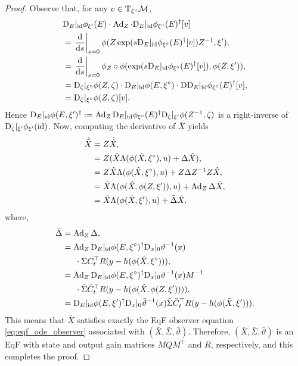\documentclass{article}
\newcommand\at[2]{\left.#1\right|_{#2}}
\newcommand{\dds}{\frac{\td}{\td s}}
\begin{document}
\begin{proof}
Observe that, for any $v \in \mathrm{T}_{{\xi}^\circ} \mathcal{M}$,
\begin{align*}
    &\tD_E |_\id \phi_{\xi'}(E) \cdot \Ad_Z 
    \cdot \tD_E |_\id \phi_{\mr{\xi}}(E)^\dagger [v] \\
    &= \at{\dds}{s=0} \phi(Z \exp( s \tD_E |_\id \phi_{\mr{\xi}}(E)^\dagger [v]) Z^{-1}, \xi'), \\
    &= \at{\dds}{s=0} \phi_Z \circ \phi(\exp( s \tD_E |_\id \phi_{\mr{\xi}}(E)^\dagger [v]), \phi(Z, \xi')), \\
    &= \tD_\zeta |_{\mr{\xi}} \phi(Z, \zeta)
    \cdot \tD_E |_\id \phi(E, \mr{\xi})
    \cdot \tD \tD_E |_\id \phi_{\mr{\xi}}(E)^\dagger [v], \\
    &= \tD_\zeta |_{\mr{\xi}} \phi(Z, \zeta) [v].
\end{align*}
Hence $\mathrm{D}_E |_{\mathrm{id}} \phi(E, \xi')^\dagger := \operatorname{Ad}_Z \mathrm{D}_E |_{\mathrm{id}} \phi_{{\xi}^\circ}(E)^\dagger \mathrm{D}_\zeta |_{\xi'} \phi(Z^{-1}, \zeta)$ is a right-inverse of $\mathrm{D}_\zeta |_{\xi'} \phi_{\xi'}(\mathrm{id})$.
Now, computing the derivative of $\bar{X}$ yields
\begin{align*}
    \dot{\bar{X}}
    &= Z \dot{\hat{X}}, \\
    &= Z (\hat{X} \Lambda(\phi(\hat{X}, {\xi}^\circ), u) + \Delta \hat{X}), \\
    &= Z \hat{X} \Lambda(\phi(\hat{X}, {\xi}^\circ), u) + Z \Delta Z^{-1} Z \hat{X}, \\
    &= \bar{X} \Lambda(\phi(\hat{X}, \phi(Z, \xi')), u) + \operatorname{Ad}_Z \Delta \bar{X}, \\
    &= \bar{X} \Lambda(\phi(\bar{X}, \xi'), u) + \bar{\Delta} \bar{X},
\end{align*}
where,
\begin{align*}
    \bar{\Delta} &= \operatorname{Ad}_Z \Delta, \\
    &= \operatorname{Ad}_Z \mathrm{D}_E |_{\mathrm{id}} \phi(E, {\xi}^\circ)^{\dagger} \mathrm{D}_x |_0 \vartheta^{-1}(x)
    \\ &\phantom{==}
    \cdot \Sigma C_t^\top R (y - h(\phi(\hat{X}, {\xi}^\circ))), \\
    &= \operatorname{Ad}_Z \mathrm{D}_E |_{\mathrm{id}} \phi(E, {\xi}^\circ)^{\dagger} \mathrm{D}_x |_0 \vartheta^{-1}(x) M^{-1}
    \\ &\phantom{==}
    \cdot \bar{\Sigma} \bar{C}_t^\top R (y - h(\phi(\hat{X}, \phi(Z, \xi')))), \\
    &= \mathrm{D}_E |_{\mathrm{id}} \phi(E, \xi')^\dagger \mathrm{D}_x |_0 \bar{\vartheta}^{-1}(x) \bar{\Sigma} \bar{C}_t^\top R (y - h(\phi(\bar{X}, \xi'))).
\end{align*}
This means that $\bar{X}$ satisfies exactly the EqF observer equation \eqref{eq:eqf_ode_observer} associated with $(\bar{X}, \bar{\Sigma}, \bar{\vartheta})$.
Therefore, $(\bar{X}, \bar{\Sigma}, \bar{\vartheta})$ is an EqF with state and output gain matrices $M Q M^\top$ and $R$, respectively, and this completes the proof.
\end{proof}
\end{document}
